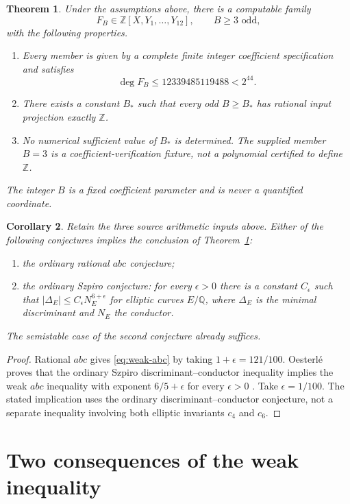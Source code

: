 \documentclass[11pt,a4paper]{article}
\newtheorem{theorem}{Theorem}[section]
\newtheorem{corollary}[theorem]{Corollary}
\newcommand{\Q}{\mathbb Q}\newcommand{\Z}{\mathbb Z}
\begin{document}
\begin{theorem}\label{thm:main}
Under the assumptions above, there is a computable family
\[
 F_B\in\Z[X,Y_1,\ldots,Y_{12}],\qquad B\ge3\text{ odd},
\]
with the following properties.
\begin{enumerate}
\item Every member is given by a complete finite integer coefficient
specification and satisfies
\[
             \deg F_B\le12339485119488<2^{44}.
\]
\item There exists a constant $B_*$ such that every odd $B\ge B_*$
has rational input projection exactly $\Z$.
\item No numerical sufficient value of $B_*$ is determined.
The supplied member $B=3$ is a coefficient-verification fixture,
not a polynomial certified to define $\Z$.
\end{enumerate}
The integer $B$ is a fixed coefficient parameter and is never a
quantified coordinate.
\end{theorem}

\begin{corollary}\label{cor:conjectures}
Retain the three source arithmetic inputs above. Either of the following
conjectures implies the conclusion of Theorem~\ref{thm:main}:
\begin{enumerate}
\item the ordinary rational $abc$ conjecture;
\item the ordinary Szpiro conjecture: for every $\epsilon>0$ there
is a constant $C_\epsilon$ such that
$|\Delta_E|\le C_\epsilon N_E^{6+\epsilon}$ for elliptic curves
$E/\Q$, where $\Delta_E$ is the minimal discriminant and $N_E$
the conductor.
\end{enumerate}
The semistable case of the second conjecture already suffices.
\end{corollary}
\begin{proof}
Rational $abc$ gives \eqref{eq:weak-abc} by taking
$1+\epsilon=121/100$. Oesterl\'e proves that the ordinary
Szpiro discriminant--conductor inequality implies the weak
$abc$ inequality with exponent $6/5+\epsilon$ for every
$\epsilon>0$ \cite[Section~I.3, p.~169]{Oesterle}.
Take $\epsilon=1/100$. The stated implication uses the
ordinary discriminant--conductor conjecture, not a separate
inequality involving both elliptic invariants $c_4$ and $c_6$.
\end{proof}


\section{Two consequences of the weak inequality}
\end{document}
